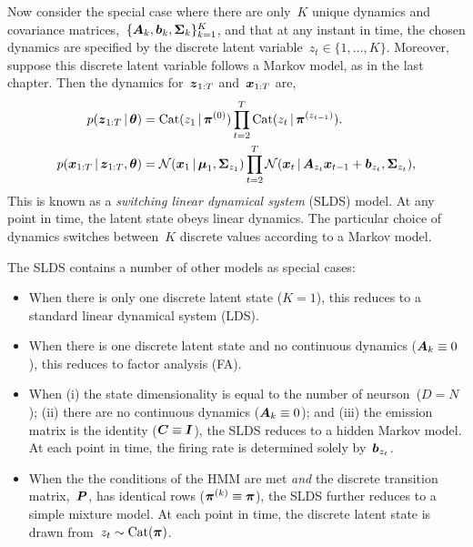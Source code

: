 Now consider the special case where there are only~$K$ unique dynamics
and covariance matrices,~${\{\boldsymbol{A}_k, \boldsymbol{b}_k, \boldsymbol{\Sigma}_k\}_{k=1}^K}$, and that at
any instant in time, the chosen dynamics are specified by the
discrete latent variable~${z_t \in \{1, \ldots, K\}}$. Moreover,
suppose this discrete latent variable follows a Markov model,
as in the last chapter. Then the dynamics for~$\boldsymbol{z}_{1:T}$ and~$\boldsymbol{x}_{1:T}$
are,
\begin{align*}
  p(\boldsymbol{z}_{1:T} \,|\, \boldsymbol{\theta}) 
  &=
    \mathrm{Cat}(z_1\,|\, \boldsymbol{\pi}^{(0)})
    \prod_{t=2}^T \mathrm{Cat}(z_t \,|\, \boldsymbol{\pi}^{(z_{t-1})}).
  \\
  p(\boldsymbol{x}_{1:T} \,|\, \boldsymbol{z}_{1:T}, \boldsymbol{\theta})
  &= 
    \mathcal{N}(\boldsymbol{x}_1 \,|\, \boldsymbol{\mu}_1, \boldsymbol{\Sigma}_{z_1})
    \prod_{t=2}^T \mathcal{N}(\boldsymbol{x}_t \,|\, \boldsymbol{A}_{z_t} \boldsymbol{x}_{t-1} + \boldsymbol{b}_{z_t}, \boldsymbol{\Sigma}_{z_t}),
\end{align*}
This is known as a \emph{switching linear dynamical system} (SLDS)
model. At any point in time, the latent state obeys linear dynamics.
The particular choice of dynamics switches between~$K$ discrete values
according to a Markov model.

The SLDS contains a number of other models as special cases:
\begin{itemize}
\item When there is only one discrete latent state ($K=1$), this
  reduces to a standard linear dynamical system (LDS).
  
\item When there is one discrete latent state and no continuous dynamics
  (${\boldsymbol{A}_k \equiv 0}$), this reduces to factor analysis (FA).

\item When (i) the state dimensionality is equal to the number of
  neurson~($D=N$); (ii) there are no continuous dynamics (${\boldsymbol{A}_k
    \equiv 0}$); and (iii) the emission matrix is the identity (${\boldsymbol{C}
    \equiv \boldsymbol{I}}$), the SLDS reduces to a hidden Markov model. At each
  point in time, the firing rate is determined solely
  by~$\boldsymbol{b}_{z_t}$.

\item When the the conditions of the HMM are met \emph{and} the
  discrete transition matrix,~$\boldsymbol{P}$, has identical rows (${\boldsymbol{\pi}^{(k)}
    \equiv \boldsymbol{\pi}}$), the SLDS further reduces to a simple mixture
  model. At each point in time, the discrete latent state is drawn
  from~${z_t \sim \mathrm{Cat}(\boldsymbol{\pi})}$.
\end{itemize}

